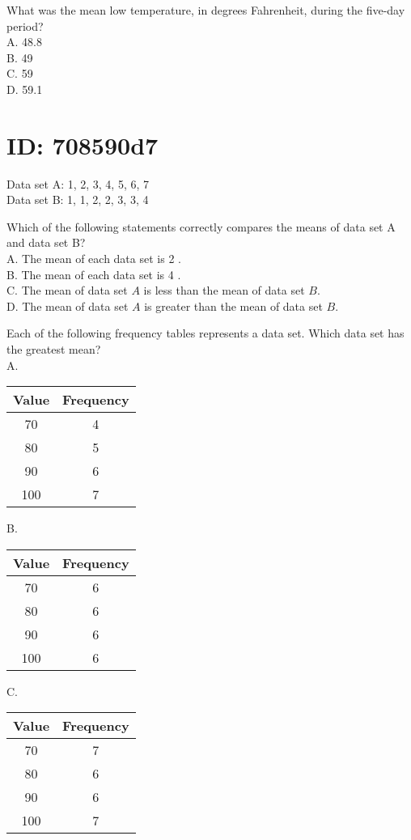 What was the mean low temperature, in degrees Fahrenheit, during the five-day period?\\
A. 48.8\\
B. 49\\
C. 59\\
D. 59.1

\section*{ID: 708590d7}
Data set A: 1, 2, 3, 4, 5, 6, 7\\
Data set B: 1, 1, 2, 2, 3, 3, 4

Which of the following statements correctly compares the means of data set A and data set B?\\
A. The mean of each data set is 2 .\\
B. The mean of each data set is 4 .\\
C. The mean of data set $A$ is less than the mean of data set $B$.\\
D. The mean of data set $A$ is greater than the mean of data set $B$.

Each of the following frequency tables represents a data set. Which data set has the greatest mean?\\
A.

\begin{center}
\begin{tabular}{|c|c|}
\hline
Value & Frequency \\
\hline
70 & 4 \\
\hline
80 & 5 \\
\hline
90 & 6 \\
\hline
100 & 7 \\
\hline
\end{tabular}
\end{center}

B.

\begin{center}
\begin{tabular}{|c|c|}
\hline
Value & Frequency \\
\hline
70 & 6 \\
\hline
80 & 6 \\
\hline
90 & 6 \\
\hline
100 & 6 \\
\hline
\end{tabular}
\end{center}

C.

\begin{center}
\begin{tabular}{|c|c|}
\hline
Value & Frequency \\
\hline
70 & 7 \\
\hline
80 & 6 \\
\hline
90 & 6 \\
\hline
100 & 7 \\
\hline
\end{tabular}
\end{center}


